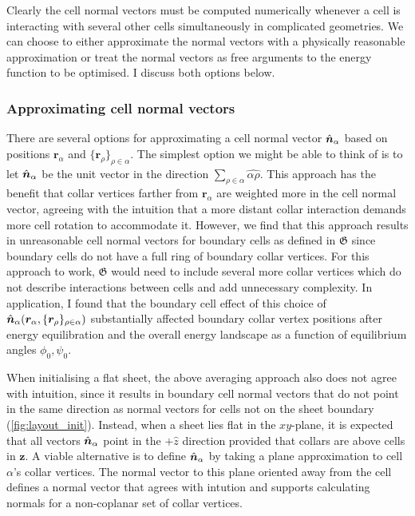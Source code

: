 Clearly the cell normal vectors must be computed numerically whenever a cell is interacting with several other cells simultaneously in complicated geometries. 
We can choose to either approximate the normal vectors with a physically reasonable approximation or treat the normal vectors as free arguments to the energy function to be optimised.
I discuss both options below. 

\subsubsection{Approximating cell normal vectors} \label{subsubsec:approx_norm}

There are several options for approximating a cell normal vector $\hat{\bm{n}}_\alpha$ based on positions $\bm{r}_\alpha$ and $\{ \bm{r}_\rho\}_{\rho\in\alpha}$. The simplest option we might be able to think of is to let $\hat{\bm{n}}_\alpha$ be the unit vector in the direction $\sum_{\rho\in\alpha}\hat{\alpha\rho}$. 
This approach has the benefit that collar vertices farther from $\bm{r}_\alpha$ are weighted more in the cell normal vector, agreeing with the intuition that a more distant collar interaction demands more cell rotation to accommodate it. 
However, we find that this approach results in unreasonable cell normal vectors for boundary cells as defined in $\mathfrak{G}$ since boundary cells do not have a full ring of boundary collar vertices. 
For this approach to work, $\mathfrak{G}$ would need to include several more collar vertices which do not describe interactions between cells and add unnecessary complexity.
In application, I found that the boundary cell effect of this choice of $\hat{\bm{n}}_\alpha(\bm{r}_\alpha, \{\bm{r}_\rho\}_{\rho\in\alpha})$ substantially affected boundary collar vertex positions after energy equilibration and the overall energy landscape as a function of equilibrium angles $\phi_0, \psi_0$. 

When initialising a flat sheet, the above averaging approach also does not agree with intuition, since it results in boundary cell normal vectors that do not point in the same direction as normal vectors for cells not on the sheet boundary (\cref{fig:layout_init}). Instead, when a sheet lies flat in the $xy$-plane, it is expected that all vectors $\hat{\bm{n}}_\alpha$ point in the $+\hat{z}$ direction provided that collars are above cells in $\bm{z}$. 
A viable alternative is to define $\hat{\bm{n}}_\alpha$ by taking a plane approximation to cell $\alpha$'s collar vertices. 
The normal vector to this plane oriented away from the cell defines a normal vector that agrees with intution and supports calculating normals for a non-coplanar set of collar vertices.


